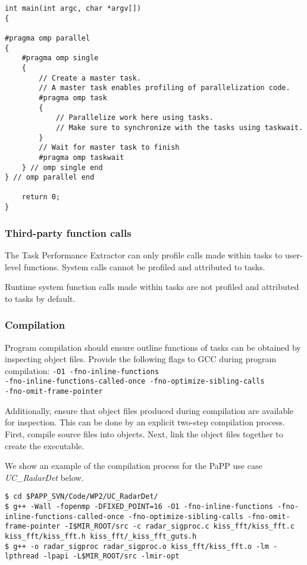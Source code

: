\documentclass[11pt,a4paper]{article}
\begin{document}
\begin{lstlisting}[style=MyCStyle]
int main(int argc, char *argv[])
{

#pragma omp parallel
{
    #pragma omp single
    {
        // Create a master task.
        // A master task enables profiling of parallelization code.
        #pragma omp task
        {
            // Parallelize work here using tasks.
            // Make sure to synchronize with the tasks using taskwait.
        }
        // Wait for master task to finish
        #pragma omp taskwait
    } // omp single end
} // omp parallel end

    return 0;
}
\end{lstlisting}

\subsubsection{Third-party function calls}

The Task Performance Extractor can only profile calls made within tasks to user-level functions. System calls cannot be profiled and attributed to tasks. 

Runtime system function calls made within tasks are not profiled and attributed to tasks by default.

\subsubsection{Compilation}

Program compilation should ensure outline functions of tasks can be obtained by inspecting object files. Provide the following flags to GCC during program compilation:
\texttt{-O1 -fno-inline-functions \\ -fno-inline-functions-called-once -fno-optimize-sibling-calls \\ -fno-omit-frame-pointer}

Additionally, ensure that object files produced during compilation are available for inspection. This can be done by an explicit two-step compilation process. First, compile source files into objects. Next, link the object files together to create the executable.

We show an example of the compilation process for the PaPP use case \textit{UC\_RadarDet} below.

\begin{lstlisting}[style=MyInputStyle]
$ cd $PAPP_SVN/Code/WP2/UC_RadarDet/
$ g++ -Wall -fopenmp -DFIXED_POINT=16 -O1 -fno-inline-functions -fno-inline-functions-called-once -fno-optimize-sibling-calls -fno-omit-frame-pointer -I$MIR_ROOT/src -c radar_sigproc.c kiss_fft/kiss_fft.c kiss_fft/kiss_fft.h kiss_fft/_kiss_fft_guts.h 
$ g++ -o radar_sigproc radar_sigproc.o kiss_fft/kiss_fft.o -lm -lpthread -lpapi -L$MIR_ROOT/src -lmir-opt
\end{lstlisting}
\end{document}
